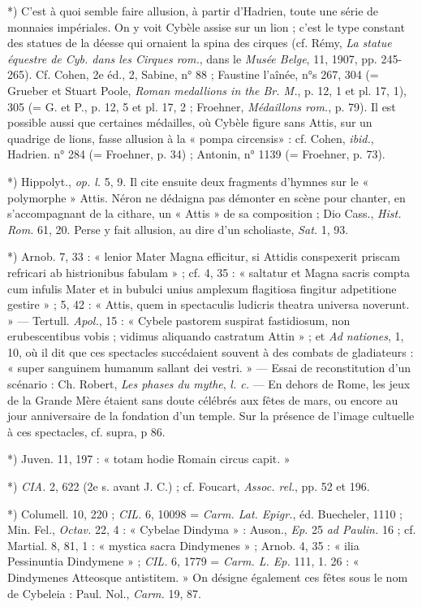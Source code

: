 \documentclass[a4paper, 11pt, oneside, polutonikogreek, french]{article}
\begin{document}
*) C'est à quoi semble faire allusion, à partir d'Hadrien, toute une série de monnaies impériales. On y voit Cybèle assise sur un lion ; c'est le type constant des statues de la déesse qui ornaient la spina des cirques (cf. Rémy, \emph{La statue équestre de Cyb. dans les Cirques rom.}, dans le \emph{Musée Belge}, 11, 1907, pp. 245-265). Cf. Cohen, 2e éd., 2, Sabine, n° 88 ; Faustine l'aînée, n°s 267, 304 (= Grueber et Stuart Poole, \emph{Roman medallions in the Br. M.}, p. 12, 1 et pl. 17, 1), 305 (= G. et P., p. 12, 5 et pl. 17, 2 ; Froehner, \emph{Médaillons rom.}, p. 79). Il est possible aussi que certaines médailles, où Cybèle figure sans Attis, sur un quadrige de lions, fasse allusion à la « pompa circensis» : cf. Cohen, \emph{ibid.}, Hadrien. n° 284 (= Froehner, p. 34) ; Antonin, n° 1139 (= Froehner, p. 73).

*) Hippolyt., \emph{op. l.} 5, 9. Il cite ensuite deux fragments d'hymnes sur le « polymorphe » Attis. Néron ne dédaigna pas démonter en scène pour chanter, en s'accompagnant de la cithare, un « Attis » de sa composition ; Dio Cass., \emph{Hist. Rom.} 61, 20. Perse y fait allusion, au dire d'un scholiaste, \emph{Sat.} 1, 93.

*) Arnob. 7, 33 : « lenior Mater Magna efficitur, si Attidis conspexerit priscam refricari ab histrionibus fabulam » ; cf. 4, 35 : « saltatur et Magna sacris compta cum infulis Mater et in bubulci unius amplexum flagitiosa fingitur adpetitione gestire » ; 5, 42 : « Attis, quem in spectaculis ludicris theatra universa noverunt. » --- Tertull. \emph{Apol.}, 15 : « Cybele pastorem suspirat fastidiosum, non erubescentibus vobis ; vidimus aliquando castratum Attin » ; et \emph{Ad nationes}, 1, 10, où il dit que ces spectacles succédaient souvent à des combats de gladiateurs : « super sanguinem humanum sallant dei vestri. » --- Essai de reconstitution d'un scénario : Ch. Robert, \emph{Les phases du mythe}, \emph{l. c.} --- En dehors de Rome, les jeux de la Grande Mère étaient sans doute célébrés aux fêtes de mars, ou encore au jour anniversaire de la fondation d'un temple. Sur la présence de l'image cultuelle à ces spectacles, cf. supra, p 86.

*) Juven. 11, 197 : « totam hodie Romain circus capit. »

*) \emph{CIA.} 2, 622 (2e s. avant J. C.) ; cf. Foucart, \emph{Assoc. rel.}, pp. 52 et 196.

*) Columell. 10, 220 ; \emph{CIL.} 6, 10098 = \emph{Carm. Lat. Epigr.}, éd. Buecheler, 1110 ; Min. Fel., \emph{Octav.} 22, 4 : « Cybelae Dindyma » : Auson., \emph{Ep.} 25 \emph{ad Paulin.} 16 ; cf. Martial. 8, 81, 1 : « mystica sacra Dindymenes » ; Arnob. 4, 35 : « ilia Pessinuntia Dindymene » ; \emph{CIL.} 6, 1779 = \emph{Carm. L. Ep.} 111, 1. 26 : « Dindymenes Atteosque antistitem. » On désigne également ces fêtes sous le nom de Cybeleia : Paul. Nol., \emph{Carm.} 19, 87.
\end{document}
